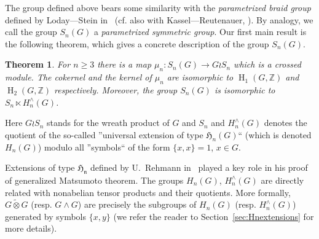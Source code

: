 \documentclass[oneside, 10pt]{amsart}
\theoremstyle{plain}
\newtheorem{thm}{Theorem}
\numberwithin{equation}{section}
\numberwithin{lemma}{section}
\theoremstyle{remark}
\theoremstyle{definition}
\DeclareMathOperator{\HH}{H}
\newcommand{\ZZ}{\mathbb{Z}}
\begin{document}
\begin{comment}
Denote by $F$ the free product of copies of the symmetric group $S_n$ in which each copy is indexed by an $n$-tuple $(g_1, \ldots, g_n) \in G^n$.
Denote by $S_n(G)$ the quotient of $F$ modulo relations of the form $s_{(g)}$ = $s_{(h)}$ in which $g, h \in G^n$ and $s\in S_n$ are such that in the wreath product $G \wr S_n = G^n \rtimes S_n$ the equality $s^g = s^h$ holds
 (here $s_{g}$ and $s_{h}$ denote images of $s \in S_n$ under respective embeddings $S_n\to F$).
It is not hard to check that there is a well defined map $\mu_n \colon S_n(G)\to G \wr S_n$ given by $s_{(g)} \mapsto s^g$.
\end{comment}
The group defined above bears some similarity with the {\it parametrized braid group} defined by Loday---Stein in~\cite{LS05} 
 (cf. also with Kassel---Reutenauer, \cite{KR98}). By analogy, we call the group $S_n(G)$ a {\it parametrized symmetric group}.
Our first main result is the following theorem, which gives a concrete description of the group $S_n(G)$.
\begin{thm} \label{thm:summary} For $n \geq 3$ there is a map $\mu_n\colon S_n(G) \to G \wr S_n$ which is a crossed module.
The cokernel and the kernel of $\mu_n$ are isomorphic to $\HH_1(G, \ZZ)$ and $\HH_2(G, \ZZ)$ respectively.
Moreover, the group $S_n(G)$ is isomorphic to $S_n \ltimes H_n^\wedge(G)$. \end{thm}
Here $G\wr S_n$ stands for the wreath product of $G$ and $S_n$ and $H_n^\wedge(G)$ denotes the quotient of the so-called 
 ''universal extension of type $\mathfrak{H}_n(G)$`` (which is denoted $H_n(G)$) 
modulo all ''symbols`` of the form $\{x, x\} = 1$, $x\in G$.

Extensions of type $\mathfrak{H_n}$ defined by U.~Rehmann in~\cite{Reh78} played a key role in his proof of generalized Matsumoto theorem.
The groups $H_n(G)$, $H_n^\wedge(G)$ are directly related with nonabelian tensor products and their quotients.
More formally,  $G \mathbin{\widetilde{\otimes}} G$ (resp. $G \wedge G$) are precisely the subgroups of 
 $H_n(G)$ (resp. $H_n^\wedge(G)$) generated by symbols $\{x, y\}$ (we refer the reader to Section~\ref{sec:Hnextensions} for more details).
 
\end{document}
